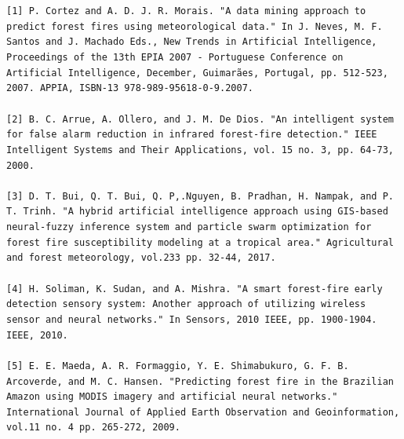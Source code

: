 \documentclass[onecolumn]{article}
\begin{document}
\nocite{*}


\begin{thebibliography}{9}

\texttt{[1]	P. Cortez and A. D. J. R. Morais. "A data mining approach to predict forest fires using meteorological data." In J. Neves, M. F. Santos and J. Machado Eds., New Trends in Artificial Intelligence, Proceedings of the 13th EPIA 2007 - Portuguese Conference on Artificial Intelligence, December, Guimarães, Portugal, pp. 512-523, 2007. APPIA, ISBN-13 978-989-95618-0-9.2007.}
\\
\\
\texttt{[2]	B. C. Arrue, A. Ollero, and J. M. De Dios. "An intelligent system for false alarm reduction in infrared forest-fire detection." IEEE Intelligent Systems and Their Applications, vol. 15 no. 3, pp. 64-73, 2000.}
\\
\\
\texttt{[3]	D. T. Bui, Q. T. Bui, Q. P,.Nguyen, B. Pradhan, H. Nampak, and P. T. Trinh. "A hybrid artificial intelligence approach using GIS-based neural-fuzzy inference system and particle swarm optimization for forest fire susceptibility modeling at a tropical area." Agricultural and forest meteorology, vol.233 pp. 32-44, 2017. }
\\
\\
\texttt{[4]	H. Soliman, K. Sudan, and A. Mishra. "A smart forest-fire early detection sensory system: Another approach of utilizing wireless sensor and neural networks." In Sensors, 2010 IEEE, pp. 1900-1904. IEEE, 2010.}
\\
\\
\texttt{[5]	E. E. Maeda, A. R. Formaggio, Y. E. Shimabukuro, G. F. B. Arcoverde, and M. C. Hansen. "Predicting forest fire in the Brazilian Amazon using MODIS imagery and artificial neural networks." International Journal of Applied Earth Observation and Geoinformation, vol.11 no. 4 pp. 265-272, 2009.}
\end{thebibliography}
\end{document}
